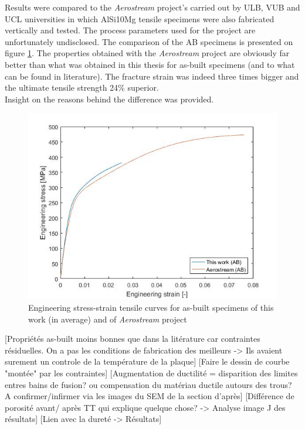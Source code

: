Results were compared to the \textit{Aerostream} project's carried out by ULB, VUB and UCL universities in which AlSi10Mg tensile specimens were also fabricated vertically and tested. The process parameters used for the project are unfortunately undisclosed. The comparison of the AB specimens is presented on figure \ref{fig:AerAB}. The properties obtained with the \textit{Aerostream} project are obviously far better than what was obtained in this thesis for as-built specimens (and to what can be found in literature). The fracture strain was indeed three times bigger and the ultimate tensile strength 24\% superior. \\

Insight on the reasons behind the difference was provided.

\begin{figure}[ht]
	\centering
	\centerline{\includegraphics[scale=0.64]{Images/AerAB}}
	\decoRule
	\caption[Engineering stress-strain tensile curves for as-built specimens of this work (in average) and of \textit{Aerostream} project]{Engineering stress-strain tensile curves for as-built specimens of this work (in average) and of \textit{Aerostream} project}
	\label{fig:AerAB}
\end{figure}

[Propriétés as-built moins bonnes que dans la litérature car contraintes résiduelles. On a pas les conditions de fabrication des meilleurs -> Ils avaient surement un controle de la température de la plaque] 
[Faire le dessin de courbe "montée" par les contraintes]
[Augmentation de ductilité = disparition des	limites entres bains de fusion? ou compensation du matériau ductile autours des trous? A confirmer/infirmer via les images du SEM de la section d'après]
[Différence de porosité avant/ après TT qui explique quelque chose? -> Analyse image J des résultats]
[Lien avec la dureté -> Résultats]


